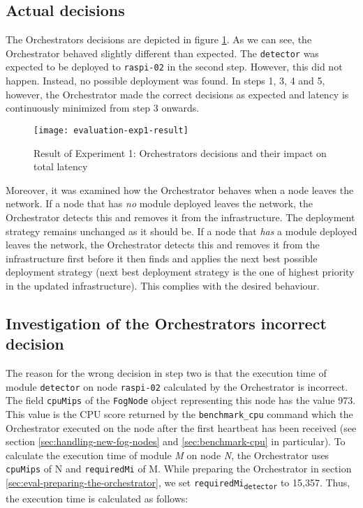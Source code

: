 \subsection{Actual decisions}

The Orchestrators decisions are depicted in figure \ref{fig:evaluation-exp1-results}. As we can see, the Orchestrator behaved slightly different than expected. The \texttt{detector} was expected to be deployed to \texttt{raspi-02} in the second step. However, this did not happen. Instead, no possible deployment was found. In steps 1, 3, 4 and 5, however, the Orchestrator made the correct decisions as expected and latency is continuously minimized from step 3 onwards.

\begin{figure}[htb]
    \centering
    \texttt{[image: evaluation-exp1-result]}
    \caption{Result of Experiment 1: Orchestrators decisions and their impact on total latency}
    \label{fig:evaluation-exp1-results}
\end{figure}

Moreover, it was examined how the Orchestrator behaves when a node leaves the network.
If a node that has \textit{no} module deployed leaves the network, the Orchestrator detects this and removes it from the infrastructure. The deployment strategy remains unchanged as it should be.
If a node that \textit{has} a module deployed leaves the network, the Orchestrator detects this and removes it from the infrastructure first before it then finds and applies the next best possible deployment strategy (next best deployment strategy is the one of highest priority in the updated infrastructure).
This complies with the desired behaviour.

\subsection{Investigation of the Orchestrators incorrect decision\label{sec:eval-investigation-cpu}}

The reason for the wrong decision in step two is that the execution time of module \texttt{detector} on node \texttt{raspi-02} calculated by the Orchestrator is incorrect.
The field \texttt{cpuMips} of the \texttt{FogNode} object representing this node has the value 973.
This value is the CPU score returned by the \texttt{benchmark\_cpu} command which the Orchestrator executed on the node after the first heartbeat has been received (see section \ref{sec:handling-new-fog-nodes} and \ref{sec:benchmark-cpu} in particular).
To calculate the execution time of module \textit{M} on node \textit{N}, the Orchestrator uses \texttt{cpuMips} of N and \texttt{requiredMi} of M.
While preparing the Orchestrator in section \ref{sec:eval-preparing-the-orchestrator}, we set \texttt{requiredMi\textsubscript{detector}} to 15,357. Thus, the execution time is calculated as follows:


